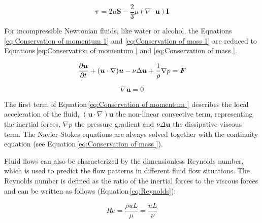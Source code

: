 \begin{equation}
\boldsymbol\tau = 2\mu\boldsymbol S - \frac{2}{3}\mu(\nabla\cdotp\boldsymbol u)\boldsymbol I
\label{eq:stress_tensor}
\end{equation}

For incompressible Newtonian fluids, like water or alcohol, the Equations\,\ref{eq:Conservation of momentum 1} and \ref{eq:Conservation of mass 1} are reduced to Equations\,\ref{eq:Conservation of momentum } and \ref{eq:Conservation of mass }\cite{versteeg2007introduction}. 

\begin{equation}
{\partial{\boldsymbol u}\over{\partial t}} + ({\boldsymbol u} \cdot \nabla) {\boldsymbol u} - \nu\Delta{\boldsymbol u}+ \frac{1}{\rho}\nabla p = {\boldsymbol F}
\label{eq:Conservation of momentum }
\end{equation}

\begin{equation}
\nabla{\boldsymbol u} = 0
\label{eq:Conservation of mass }
\end{equation}
 
The first term of Equation\,\ref{eq:Conservation of momentum } describes the local acceleration of the fluid, $({\boldsymbol u} \cdot \nabla) {\boldsymbol u}$ the non-linear convective term, representing the inertial forces, $\nabla p$ the pressure gradient and $\nu\Delta{\boldsymbol u}$ the dissipative viscous term. The Navier-Stokes equations are always solved together with the continuity equation (see Equation\,\ref{eq:Conservation of mass }).
 
Fluid flows can also be characterized by the dimensionless Reynolds number, which is used to predict the flow patterns in different fluid flow situations. The Reynolds number is defined as the ratio of the inertial forces to the viscous forces and can be written as follows (Equation\,\ref{eq:Reynolds}):  

\begin{equation}
Re=\frac{\rho u L}{\mu}=\frac{uL}{\nu}
\label{eq:Reynolds}
\end{equation}

